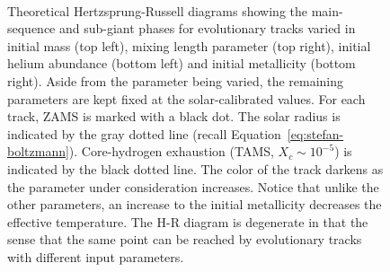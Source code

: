 \begin{figure}
    \centering
    \\
    \caption[Evolutionary tracks]{Theoretical Hertzsprung-Russell diagrams showing the main-sequence and sub-giant phases for evolutionary tracks varied in initial mass (top left), mixing length parameter (top right), initial helium abundance (bottom left) and initial metallicity (bottom right). 
    Aside from the parameter being varied, the remaining parameters are kept fixed at the solar-calibrated values. 
    For each track, ZAMS is marked with a black dot. 
    The solar radius is indicated by the gray dotted line (recall Equation~\ref{eq:stefan-boltzmann}). 
    Core-hydrogen exhaustion (TAMS, ${X_c \sim 10^{-5}}$) is indicated by the black dotted line. 
    The color of the track darkens as the parameter under consideration increases. 
    Notice that unlike the other parameters, an increase to the initial metallicity decreases the effective temperature. 
    The H-R diagram is degenerate in that the sense that the same point can be reached by evolutionary tracks with different input parameters. 
    \label{fig:evolutionary-tracks}}
\end{figure}
